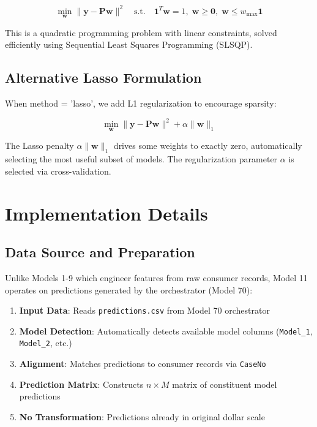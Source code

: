 \begin{equation}
\min_{\mathbf{w}} \|\mathbf{y} - \mathbf{P}\mathbf{w}\|^2 \quad \text{s.t.} \quad \mathbf{1}^T\mathbf{w} = 1, \; \mathbf{w} \geq \mathbf{0}, \; \mathbf{w} \leq w_{\max}\mathbf{1}
\end{equation}

This is a quadratic programming problem with linear constraints, solved efficiently using Sequential Least Squares Programming (SLSQP).

\subsection{Alternative Lasso Formulation}

When method = 'lasso', we add L1 regularization to encourage sparsity:

\begin{equation}
\min_{\mathbf{w}} \|\mathbf{y} - \mathbf{P}\mathbf{w}\|^2 + \alpha \|\mathbf{w}\|_1
\end{equation}

The Lasso penalty $\alpha \|\mathbf{w}\|_1$ drives some weights to exactly zero, automatically selecting the most useful subset of models. The regularization parameter $\alpha$ is selected via cross-validation.

\section{Implementation Details}

\subsection{Data Source and Preparation}

Unlike Models 1-9 which engineer features from raw consumer records, Model 11 operates on predictions generated by the orchestrator (Model 70):

\begin{enumerate}
    \item \textbf{Input Data}: Reads \texttt{predictions.csv} from Model 70 orchestrator
    \item \textbf{Model Detection}: Automatically detects available model columns (\texttt{Model\_1}, \texttt{Model\_2}, etc.)
    \item \textbf{Alignment}: Matches predictions to consumer records via \texttt{CaseNo}
    \item \textbf{Prediction Matrix}: Constructs $n \times M$ matrix of constituent model predictions
    \item \textbf{No Transformation}: Predictions already in original dollar scale
\end{enumerate}

